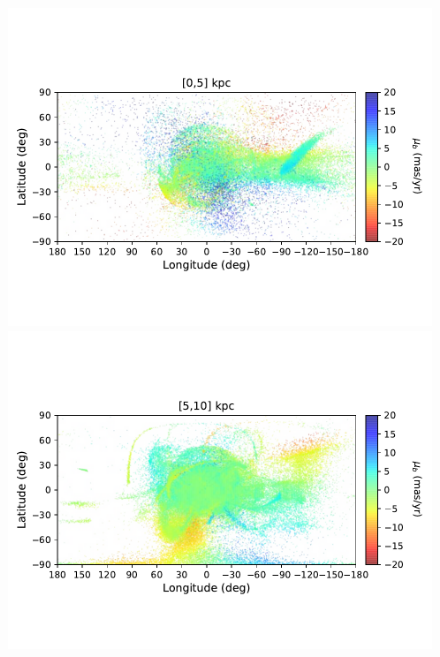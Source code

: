 \begin{figure}[h!]
\begin{center}
            \includegraphics[clip=true, trim = 0mm 20mm 0mm 20mm, width=\columnwidth]{images/PII_ensemble_LB_D0-5_PMB_new.pdf}
            \includegraphics[clip=true, trim = 0mm 20mm 0mm 20mm, width=\columnwidth]{images/PII_ensemble_LB_D5-10_PMB_new.pdf}


\end{center}
\end{figure}
